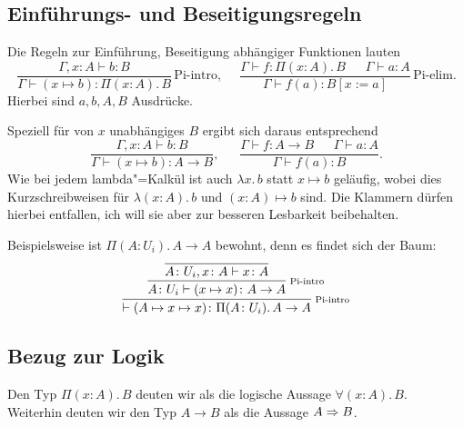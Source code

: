 \subsection{Einführungs- und Beseitigungsregeln}

Die Regeln zur Einführung, Beseitigung abhängiger Funktionen lauten
\[\dfrac{\Gamma,x\colon A\vdash b\colon B}
{\Gamma\vdash (x\mapsto b)\colon\Pi(x\colon A).\, B}\,\text{Pi-intro},\quad\;
\dfrac{\Gamma\vdash f\colon\Pi(x\colon A).\,B\quad\;\;\Gamma\vdash a\colon A}
{\Gamma\vdash f(a)\colon B[x:=a]}\,\text{Pi-elim}.\]
Hierbei sind $a,b,A,B$ Ausdrücke.

Speziell für von $x$ unabhängiges $B$ ergibt sich daraus entsprechend
\[\dfrac{\Gamma,x\colon A\vdash b\colon B}
{\Gamma\vdash (x\mapsto b)\colon A\to B},\quad\;\;
\dfrac{\Gamma\vdash f\colon A\to B\quad\;\;\Gamma\vdash a\colon A}
{\Gamma\vdash f(a)\colon B}.\]
Wie bei jedem lambda"=Kalkül ist auch $\lambda x.\,b$ statt $x\mapsto b$
geläufig, wobei dies Kurzschreibweisen für $\lambda(x\colon A).\,b$ und
$(x\colon A)\mapsto b$ sind. Die Klammern dürfen hierbei entfallen, ich
will sie aber zur besseren Lesbarkeit beibehalten.

Beispielsweise ist $\Pi(A\colon U_i).\, A\to A$ bewohnt, denn es findet sich der Baum:
\[\infer[\infernote{Pi-intro}]{\vdash (A\mapsto x\mapsto x)\colon\Pi(A\colon U_i).\,A\to A}{
  \infer[\infernote{Pi-intro}]{A\colon U_i\vdash (x\mapsto x)\colon A\to A}{
    \infer{A\colon U_i,x\colon A\vdash x\colon A}{}}}\]

\subsection{Bezug zur Logik}

Den Typ $\Pi(x\colon A).\, B$ deuten wir als die logische Aussage
$\forall (x\colon A).\, B$. Weiterhin deuten wir den Typ $A\to B$ als die
Aussage $A\Rightarrow B$.

